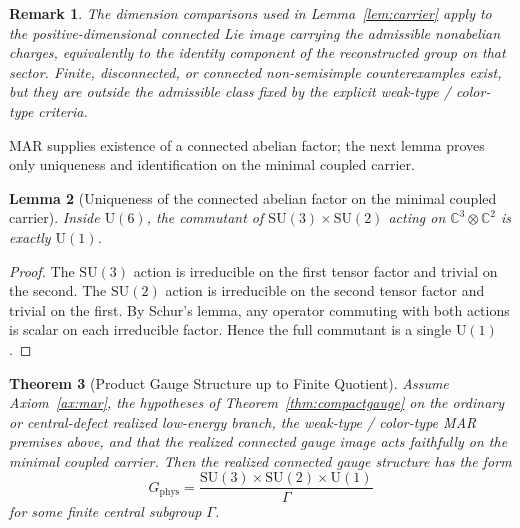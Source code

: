 \documentclass[11pt]{article}
\newtheorem{theorem}{Theorem}[section]
\newtheorem{lemma}[theorem]{Lemma}
\newtheorem{remark}[theorem]{Remark}
\newcommand{\SU}{\mathrm{SU}}
\newcommand{\U}{\mathrm{U}}
\begin{document}
\begin{remark}\label{rem:connectedlie}
The dimension comparisons used in Lemma~\ref{lem:carrier} apply to the positive-dimensional connected Lie image carrying the admissible nonabelian charges, equivalently to the identity component of the reconstructed group on that sector. Finite, disconnected, or connected non-semisimple counterexamples exist, but they are outside the admissible class fixed by the explicit weak-type / color-type criteria.
\end{remark}

MAR supplies existence of a connected abelian factor; the next lemma proves only uniqueness and identification on the minimal coupled carrier.

\begin{lemma}[Uniqueness of the connected abelian factor on the minimal coupled carrier]\label{lem:commutant}
Inside $\U(6)$, the commutant of $\SU(3)\times\SU(2)$ acting on $\mathbb C^3\otimes \mathbb C^2$ is exactly $\U(1)$.
\end{lemma}

\begin{proof}
The $\SU(3)$ action is irreducible on the first tensor factor and trivial on the second. The $\SU(2)$ action is irreducible on the second tensor factor and trivial on the first. By Schur's lemma, any operator commuting with both actions is scalar on each irreducible factor. Hence the full commutant is a single $\U(1)$.
\end{proof}

\begin{theorem}[Product Gauge Structure up to Finite Quotient]\label{thm:sm}
Assume Axiom~\ref{ax:mar}, the hypotheses of Theorem~\ref{thm:compactgauge} on the ordinary or central-defect realized low-energy branch, the weak-type / color-type MAR premises above, and that the realized connected gauge image acts faithfully on the minimal coupled carrier. Then the realized connected gauge structure has the form
\[
G_{\mathrm{phys}}=
\frac{\SU(3)\times\SU(2)\times\U(1)}{\Gamma}
\]
for some finite central subgroup $\Gamma$.
\end{theorem}
\end{document}

